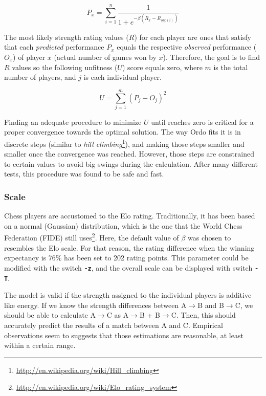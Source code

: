 \documentclass[12pt]{article}
\newcommand{\swtch} [1] {\texttt{\textbf{#1}}}
\begin{document}
	\begin{equation}
	P_{x} = \sum\limits_{i=1}^n \frac{1}{1 + e^{-\beta(R_{x}-R_{opp(i)})}}
	\end{equation}

The most likely strength rating values ($R$) for each player are ones that satisfy that each \textit{predicted} performance $P_{x}$ equals the respective \textit{observed} performance ($O_{x}$) of player $x$ (actual number of games won by $x$). 
Therefore, the goal is to find $R$ values so the following unfitness ($U$) score equals zero, where $m$ is the total number of players, and $j$ is each individual player.

	\begin{equation}
	U = \sum\limits_{j=1}^m (P_{j} - O_{j})^2
	\end{equation}

Finding an adequate procedure to minimize $U$ until reaches zero is critical for a proper convergence towards the optimal solution. 
The way Ordo fits it is in discrete steps (similar to \textit{hill climbing}\footnote{\url{http://en.wikipedia.org/wiki/Hill_climbing}}), and making those steps smaller and smaller once the convergence was reached. 
However, those steps are constrained to certain values to avoid big swings during the calculation.
After many different tests, this procedure was found to be safe and fast. 

\subsubsection*{Scale}

Chess players are accustomed to the Elo rating. 
Traditionally, it has been based on a normal (Gaussian) distribution, which is the one that the World Chess Federation (FIDE) still uses\footnote{\url{http://en.wikipedia.org/wiki/Elo_rating_system}}.
Here, the default value of $\beta$ was chosen to resembles the Elo scale.  
For that reason, the rating difference when the winning expectancy is 76\% has been set to 202 rating points.
This parameter could be modified with the switch \swtch{-z}, and the overall scale can be displayed with switch \swtch{-T}.

The model is valid if the strength assigned to the individual players is additive like energy. 
If we know the strength differences between A$\to$B and B$\to$C, we should be able to calculate A$\to$C as A$\to$B + B$\to$C.
Then, this should accurately predict the results of a match between A and C. 
Empirical observations seem to suggests that those estimations are reasonable, at least within a certain range. 
\end{document}
